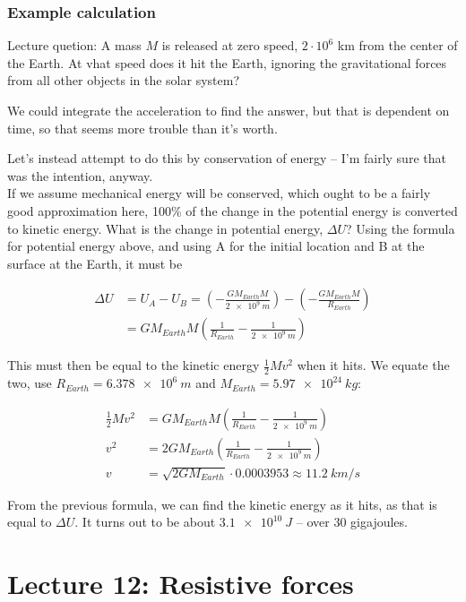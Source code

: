 \documentclass[12pt,a4paper]{report}
\begin{document}
\subsubsection{Example calculation}

Lecture quetion: A mass $M$ is released at zero speed, $2 \cdot 10^6$ km from the center of the Earth. At vhat speed does it hit the Earth, ignoring the gravitational forces from all other objects in the solar system?

We could integrate the acceleration to find the answer, but that is dependent on time, so that seems more trouble than it's worth.

Let's instead attempt to do this by conservation of energy -- I'm fairly sure that was the intention, anyway.\\
If we assume mechanical energy will be conserved, which ought to be a fairly good approximation here, 100\% of the change in the potential energy is converted to kinetic energy. What is the change in potential energy, $\Delta U$? Using the formula for potential energy above, and using A for the initial location and B at the surface at the Earth, it must be

\begin{align}
\Delta U &= U_A - U_B = \left(-\frac{G M_{Earth} M}{\SI{2e9}{m}}\right) - \left(-\frac{G M_{Earth} M}{R_{Earth}}\right)\\
         &= G M_{Earth} M \left( \frac{1}{R_{Earth}} - \frac{1}{\SI{2e9}{m}} \right)
\end{align}

This must then be equal to the kinetic energy $\displaystyle \frac{1}{2} M v^2$ when it hits. We equate the two, use $R_{Earth} = \SI{6.378e6}{m}$ and $M_{Earth} = \SI{5.97e24}{kg}$:

\begin{align}
\frac{1}{2} M v^2 &= G M_{Earth} M \left( \frac{1}{R_{Earth}} - \frac{1}{\SI{2e9}{m}} \right)\\
v^2 &= 2 G M_{Earth} \left( \frac{1}{R_{Earth}} - \frac{1}{\SI{2e9}{m}} \right)\\
v &= \sqrt{2 G M_{Earth}} \cdot 0.0003953 \approx \SI{11.2}{km/s}
\end{align}

From the previous formula, we can find the kinetic energy as it hits, as that is equal to $\Delta U$. It turns out to be about $\SI{3.1e10}{J}$ -- over 30 gigajoules.

\section{Lecture 12: Resistive forces}
\end{document}
